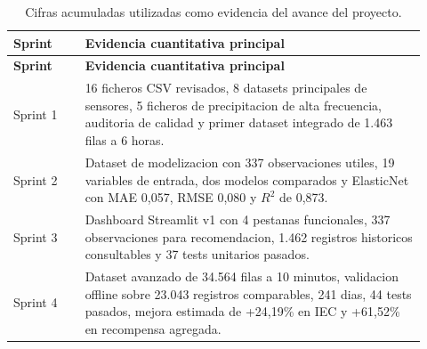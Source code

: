 ﻿\documentclass[11pt,a4paper]{article}
\begin{document}
\begin{longtable}{p{0.16\linewidth}p{0.76\linewidth}}
\caption{Cifras acumuladas utilizadas como evidencia del avance del proyecto.}\\
\toprule
\textbf{Sprint} & \textbf{Evidencia cuantitativa principal} \\
\midrule
\endfirsthead
\toprule
\textbf{Sprint} & \textbf{Evidencia cuantitativa principal} \\
\midrule
\endhead
Sprint 1 & 16 ficheros CSV revisados, 8 datasets principales de sensores, 5 ficheros de precipitacion de alta frecuencia, auditoria de calidad y primer dataset integrado de 1.463 filas a 6 horas. \\ \addlinespace
Sprint 2 & Dataset de modelizacion con 337 observaciones utiles, 19 variables de entrada, dos modelos comparados y ElasticNet con MAE 0,057, RMSE 0,080 y $R^2$ de 0,873. \\ \addlinespace
Sprint 3 & Dashboard Streamlit v1 con 4 pestanas funcionales, 337 observaciones para recomendacion, 1.462 registros historicos consultables y 37 tests unitarios pasados. \\ \addlinespace
Sprint 4 & Dataset avanzado de 34.564 filas a 10 minutos, validacion offline sobre 23.043 registros comparables, 241 dias, 44 tests pasados, mejora estimada de +24,19\% en IEC y +61,52\% en recompensa agregada. \\
\bottomrule
\end{longtable}
\end{document}
